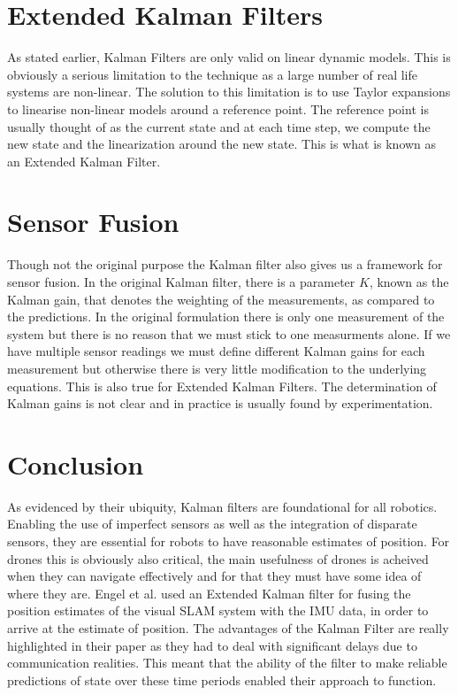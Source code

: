 \documentclass[]{article}
\begin{document}
\section{Extended Kalman Filters}

As stated earlier, Kalman Filters are only valid on linear dynamic models. This is obviously a serious limitation to the technique as a large number of real life systems are non-linear.
The solution to this limitation is to use Taylor expansions to linearise non-linear models around a reference point. The reference point is usually thought of as the current state and at each time step, we compute the new state and the linearization around the new state.
This is what is known as an Extended Kalman Filter.

\section{Sensor Fusion}

Though not the original purpose the Kalman filter also gives us a framework for sensor fusion. In the original Kalman filter, there is a parameter $K$, known as the Kalman gain, that denotes the weighting of the measurements, as compared to the predictions. 
In the original formulation there is only one measurement of the system but there is no reason that we must stick to one measurments alone. If we have multiple sensor readings we must define different Kalman gains for each measurement but otherwise there is very little modification to the underlying equations.
This is also true for Extended Kalman Filters. The determination of Kalman gains is not clear and in practice is usually found by experimentation.

\section{Conclusion}

As evidenced by their ubiquity, Kalman filters are foundational for all robotics. Enabling the use of imperfect sensors as well as the integration of disparate sensors, they are essential for robots to have reasonable estimates of position. 
For drones this is obviously also critical, the main usefulness of drones is acheived when they can navigate effectively and for that they must have some idea of where they are.
Engel et al. \cite{Engel:Camera-basedNav} used an Extended Kalman filter for fusing the position estimates of the visual SLAM system with the IMU data, in order to arrive at the estimate of position. The advantages of the Kalman Filter are really highlighted in their paper as they had to deal with significant delays due to communication realities.
This meant that the ability of the filter to make reliable predictions of state over these time periods enabled their approach to function.





\end{document}
